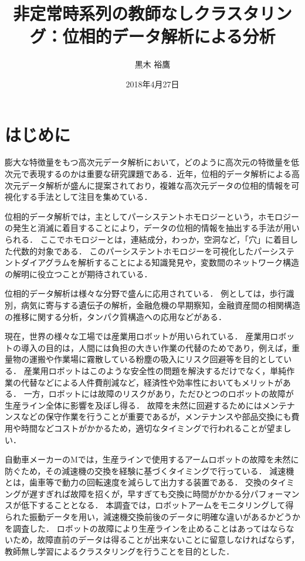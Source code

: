 \documentclass{jarticle}
\title{非定常時系列の教師なしクラスタリング：位相的データ解析による分析}
\author{黒木 裕鷹}
\date{2018年4月27日}
\begin{document}
\maketitle
\section{はじめに}
膨大な特徴量をもつ高次元データ解析において，どのように高次元の特徴量を低次元で表現するのかは重要な研究課題である．近年，位相的データ解析による高次元データ解析が盛んに提案されており，複雑な高次元データの位相的情報を可視化する手法として注目を集めている．

位相的データ解析では，主としてパーシステントホモロジー\cite{Edelsbrunner2002}という，ホモロジーの発生と消滅に着目することにより，データの位相的情報を抽出する手法が用いられる．
ここでホモロジーとは，連結成分，わっか，空洞など，「穴」に着目した代数的対象である．
このパーシステントホモロジーを可視化したパーシステントダイアグラム\cite{Otter2017}を解析することによる知識発見や，変数間のネットワーク構造の解明に役立つことが期待されている．

位相的データ解析は様々な分野で盛んに応用されている．
例としては，歩行識別\cite{Lamar2012}，病気に寄与する遺伝子の解析\cite{Platt2016}，金融危機の早期察知\cite{Gidea2017}，金融資産間の相関構造の推移に関する分析\cite{Gidea2018}，タンパク質構造への応用\cite{Hiraoka2012}などがある．

現在，世界の様々な工場では産業用ロボットが用いられている．
産業用ロボットの導入の目的は，人間には負担の大きい作業の代替のためであり，例えば，重量物の運搬や作業場に霧散している粉塵の吸入にリスク回避等を目的としている．
産業用ロボットはこのような安全性の問題を解決するだけでなく，単純作業の代替などによる人件費削減など，経済性や効率性においてもメリットがある．
一方，ロボットには故障のリスクがあり，ただひとつのロボットの故障が生産ライン全体に影響を及ぼし得る．
故障を未然に回避するためにはメンテナンスなどの保守作業を行うことが重要であるが，メンテナンスや部品交換にも費用や時間などコストがかかるため，適切なタイミングで行われることが望ましい．


自動車メーカーのMでは，生産ラインで使用するアームロボットの故障を未然に防ぐため，その減速機の交換を経験に基づくタイミングで行っている．
減速機とは，歯車等で動力の回転速度を減らして出力する装置である．
交換のタイミングが遅すぎれば故障を招くが，早すぎても交換に時間がかかる分パフォーマンスが低下することとなる．
本調査では，ロボットアームをモニタリングして得られた振動データを用い，減速機交換前後のデータに明確な違いがあるかどうかを調査した．
ロボットの故障により生産ラインを止めることはあってはならないため，故障直前のデータは得ることが出来ないことに留意しなければならず，教師無し学習によるクラスタリングを行うことを目的とした．
\end{document}
